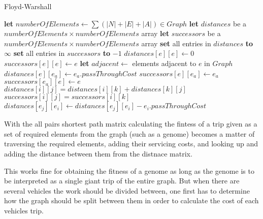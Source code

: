 \begin{algorithm}[thbp]
\caption{Floyd-Warshall}\label{floyd-warshall-pseudocode}
\begin{algorithmic}[1]

	\State \textbf{let} $numberOfElements \leftarrow \sum (|N|+|E|+|A|) \in Graph$
	\State \textbf{let} $distances$ be a $numberOfElements \times numberOfElements$ array
	\State \textbf{let} $successors$ be a $numberOfElements \times numberOfElements$ array
	\State \textbf{set} all entries in $distances$ \textbf{to} $\infty$
	\State \textbf{set} all entries in $successors$ \textbf{to} $-1$
	\Statex
		\State $distances[e][e] \leftarrow 0$
		\State $successors[e][e] \leftarrow e$
	\EndFor
	\Statex
		\State \textbf{let} $adjacent \leftarrow $ elements adjacent to $e$ in $Graph$
			\State $distances[e][e_a] \leftarrow e_a.passThroughCost$
			\State $successors[e][e_a] \leftarrow e_a$
			\State $successors[e_a][e] \leftarrow e$
		\EndFor
	\EndFor
	\Statex
					\State $distances[i][j] = distances[i][k] + distances[k][j]$
					\State $successors[i][j] = successors[i][k]$
				\EndIf
			\EndFor
		\EndFor
	\EndFor
	\Statex
			\State $distances[e_j][e_i] \leftarrow distances[e_j][e_i] - e_i.passThroughCost$
		\EndIf
	\EndFor
\EndProcedure

\end{algorithmic}
\end{algorithm}

With the all pairs shortest path matrix calculating the fintess of a trip given as a set of required elements from the graph (such as a genome) becomes a matter of traversing the required elements, adding their servicing costs, and looking up and adding the distance between them from the distnace matrix.

This works fine for obtaining the fitness of a genome as long as the genome is to be interpreted as a single giant trip of the entire graph. But when there are several vehicles the work should be divided between, one first has to determine how the graph should be split between them in order to calculate the cost of each vehicles trip.

